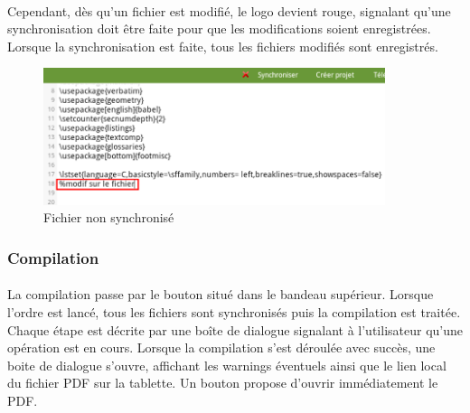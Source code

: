 \documentclass[a4paper,12pt]{article}
\begin{document}
\paragraph*{}
Cependant, dès qu'un fichier est modifié, le logo devient rouge, signalant qu'une synchronisation doit être faite pour que les modifications soient enregistrées. Lorsque la synchronisation est faite, tous les fichiers modifiés sont enregistrés.
\begin{figure}[!ht]
\begin{center}
  \includegraphics[width=10cm]{./images/screenshot/synchro2_android.png}
\end{center}
  \caption{Fichier non synchronisé}
  \label{Fichier non synchronisé}
\end{figure}

\newpage
\subsubsection{Compilation}
\paragraph*{}
La compilation passe par le bouton situé dans le bandeau supérieur. Lorsque l'ordre est lancé, tous les fichiers sont synchronisés puis la compilation est traitée. Chaque étape est décrite par une boîte de dialogue signalant à l'utilisateur qu'une opération est en cours.
Lorsque la compilation s'est déroulée avec succès, une boite de dialogue s'ouvre, affichant les warnings éventuels ainsi que le lien local du fichier PDF sur la tablette. Un bouton propose d'ouvrir immédiatement le PDF.
\end{document}
